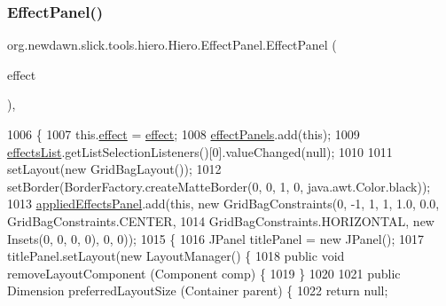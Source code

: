 \subsubsection{\texorpdfstring{Effect\+Panel()}{EffectPanel()}}
{\footnotesize\ttfamily org.\+newdawn.\+slick.\+tools.\+hiero.\+Hiero.\+Effect\+Panel.\+Effect\+Panel (\begin{DoxyParamCaption}\item[{final \mbox{\hyperlink{interfaceorg_1_1newdawn_1_1slick_1_1font_1_1effects_1_1_configurable_effect}{Configurable\+Effect}}}]{effect }\end{DoxyParamCaption})\hspace{0.3cm}{\ttfamily [inline]}, {\ttfamily [private]}}


\begin{DoxyCode}
1006                                                               \{
1007             this.\mbox{\hyperlink{classorg_1_1newdawn_1_1slick_1_1tools_1_1hiero_1_1_hiero_1_1_effect_panel_a57287dac230d74e637ffe17f55736869}{effect}} = \mbox{\hyperlink{classorg_1_1newdawn_1_1slick_1_1tools_1_1hiero_1_1_hiero_1_1_effect_panel_a57287dac230d74e637ffe17f55736869}{effect}};
1008             \mbox{\hyperlink{classorg_1_1newdawn_1_1slick_1_1tools_1_1hiero_1_1_hiero_a84dc85d78d9ad7b44e24e045b0a0cd84}{effectPanels}}.add(\textcolor{keyword}{this});
1009             \mbox{\hyperlink{classorg_1_1newdawn_1_1slick_1_1tools_1_1hiero_1_1_hiero_aff0431ced360227e02cdf9bcd21fd4d2}{effectsList}}.getListSelectionListeners()[0].valueChanged(null);
1010 
1011             setLayout(\textcolor{keyword}{new} GridBagLayout());
1012             setBorder(BorderFactory.createMatteBorder(0, 0, 1, 0, java.awt.Color.black));
1013             \mbox{\hyperlink{classorg_1_1newdawn_1_1slick_1_1tools_1_1hiero_1_1_hiero_af3ffcf548dfbc171feacb865c1302904}{appliedEffectsPanel}}.add(\textcolor{keyword}{this}, \textcolor{keyword}{new} GridBagConstraints(0, -1, 1, 1, 1.0, 0.0, 
      GridBagConstraints.CENTER,
1014                 GridBagConstraints.HORIZONTAL, \textcolor{keyword}{new} Insets(0, 0, 0, 0), 0, 0));
1015             \{
1016                 JPanel titlePanel = \textcolor{keyword}{new} JPanel();
1017                 titlePanel.setLayout(\textcolor{keyword}{new} LayoutManager() \{
1018                     \textcolor{keyword}{public} \textcolor{keywordtype}{void} removeLayoutComponent (Component comp) \{
1019                     \}
1020 
1021                     \textcolor{keyword}{public} Dimension preferredLayoutSize (Container parent) \{
1022                         \textcolor{keywordflow}{return} null;

\end{DoxyCode}
